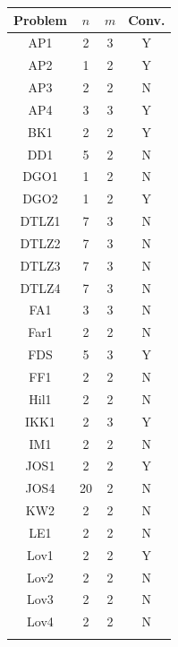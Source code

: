 \documentclass[11pt]{article}
\newcommand{\myscaletable}{0.6}
\newcommand{\lightgray}{0.95}
\numberwithin{assumption}{section}
\begin{document}
\begin{table}[H]
\centering
\begin{minipage}{0.40\textwidth}
\begin{threeparttable}{\scriptsize
\fontsize{7.0}{8.0}\selectfont
\renewcommand{\arraystretch}{\myscaletable}
\begin{tabular}{|cccc|} 
\hline
\rowcolor[gray]{.85} Problem & $n$  & $m$ & Conv. \\ 
\hline              
AP1&       2 &  3 & Y   \\ \rowcolor[gray]{\lightgray}
AP2&      1 &  2 & Y   \\
AP3&      2 &  2 & N   \\ \rowcolor[gray]{\lightgray}
AP4&      3 &  3 & Y   \\
BK1&   2 &  2 & Y   \\  \rowcolor[gray]{\lightgray}
DD1&  5 &  2 & N  \\
DGO1&    1 &  2 & N   \\  \rowcolor[gray]{\lightgray}
DGO2 &  1 & 2  & Y   \\
DTLZ1&  7 &  3 &  N  \\   \rowcolor[gray]{\lightgray}
DTLZ2&  7 & 3  & N   \\
DTLZ3&  7 & 3  & N    \\  \rowcolor[gray]{\lightgray}
DTLZ4&  7 & 3  &  N   \\
FA1&   3 & 3  & N    \\  \rowcolor[gray]{\lightgray}
Far1&  2 &  2 & N  \\ 
FDS &  5 & 3 &Y\\   \rowcolor[gray]{\lightgray}
FF1 &      2 &  2 & N   \\ 
Hil1&     2 &  2 & N   \\  \rowcolor[gray]{\lightgray}
IKK1&   2 &  3 & Y    \\ 
IM1&  2 &  2 & N \\  \rowcolor[gray]{\lightgray}
JOS1&    2 &  2 & Y  \\ 
JOS4& 20 & 2  &  N  \\  \rowcolor[gray]{\lightgray}
KW2 &  2 &  2 & N   \\   
LE1&    2 &  2 & N     \\   \rowcolor[gray]{\lightgray}
Lov1& 2 & 2 & Y \\
Lov2&  2 & 2  & N   \\  \rowcolor[gray]{\lightgray}
Lov3&  2 & 2 & N \\ 
Lov4& 2 & 2 & N \\   \rowcolor[gray]{\lightgray}

\end{tabular}}
\end{threeparttable}
\end{minipage}
\end{table}
\end{document}
